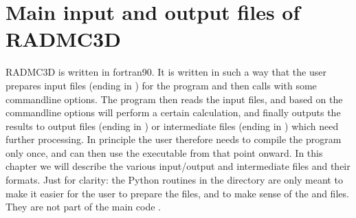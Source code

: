 \documentclass[letterpaper,10pt,english]{sphinxmanual}
\begin{document}
\chapter{Main input and output files of RADMC\sphinxhyphen{}3D}
\label{\detokenize{inputoutputfiles:main-input-and-output-files-of-radmc-3d}}\label{\detokenize{inputoutputfiles:chap-input-files}}\label{\detokenize{inputoutputfiles::doc}}
RADMC\sphinxhyphen{}3D is written in fortran\sphinxhyphen{}90. It is written in such a way that the user
prepares input files (ending in ) for the program and then calls
 with some command\sphinxhyphen{}line options. The program then reads the input
files, and based on the command\sphinxhyphen{}line options will perform a certain calculation,
and finally outputs the results to output files (ending in ) or
intermediate files (ending in ) which need further processing. In
principle the user therefore needs to compile the program only once, and can
then use the executable from that point onward. In this chapter we will describe
the various input/output and intermediate files and their formats. Just for
clarity: the Python routines in the  directory are only meant to make
it easier for the user to prepare the  files, and to make sense of the
 and  files. They are not part of the main code .
\end{document}
